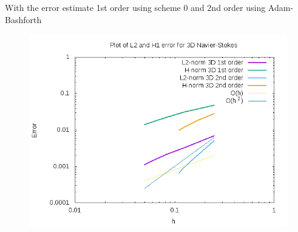 \documentclass[a4paper,10pt]{article}
\begin{document}
With the error estimate 1st order using scheme 0 and 2nd order using Adam-Bashforth
\begin{figure}[h!]
	\centering
	\includegraphics[width=0.7\linewidth]{NS_3D/error_NS_3D}
	\caption{}
	\label{fig:errorns3d}
\end{figure}
\end{document}
